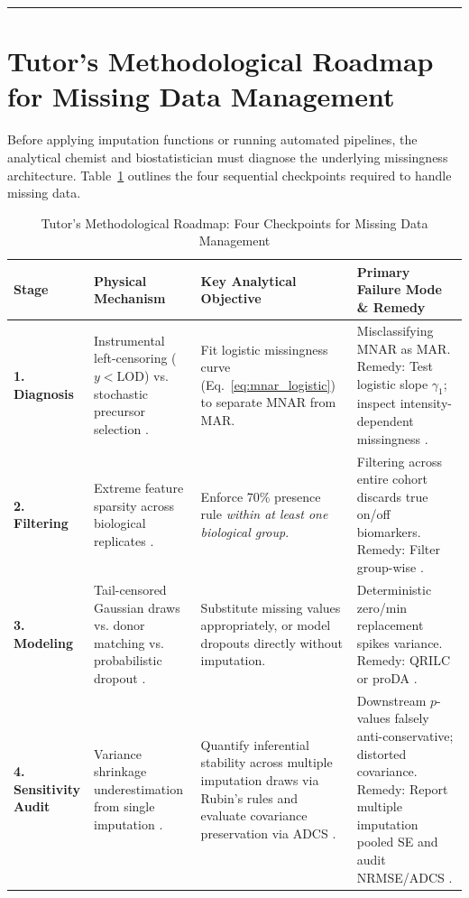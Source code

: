 \documentclass[11pt,oneside]{book}
\begin{document}
\vspace{0.8em}
\noindent\rule{\textwidth}{0.4pt}

\section{Tutor's Methodological Roadmap for Missing Data Management}

Before applying imputation functions or running automated pipelines, the analytical chemist and biostatistician must diagnose the underlying missingness architecture. Table~\ref{tab:missing_roadmap} outlines the four sequential checkpoints required to handle missing data.

\begin{table}[htbp]
\centering
\caption{Tutor's Methodological Roadmap: Four Checkpoints for Missing Data Management}
\label{tab:missing_roadmap}
\small
\begin{tabularx}{\textwidth}{l p{3.8cm} p{4.2cm} X}
\toprule
\textbf{Stage} & \textbf{Physical Mechanism} & \textbf{Key Analytical Objective} & \textbf{Primary Failure Mode \& Remedy} \\
\midrule
\textbf{1. Diagnosis} & Instrumental left-censoring ($y < \text{LOD}$) vs. stochastic precursor selection \cite{rubin1976inference, lazar2016accounting}. & Fit logistic missingness curve (Eq.~\ref{eq:mnar_logistic}) to separate MNAR from MAR. & Misclassifying MNAR as MAR. Remedy: Test logistic slope $\gamma_1$; inspect intensity-dependent missingness \cite{ahlmann2020proda}. \\
\addlinespace
\textbf{2. Filtering} & Extreme feature sparsity across biological replicates \cite{webb2020review, karpievitch2012normalization}. & Enforce 70\% presence rule \textit{within at least one biological group}. & Filtering across entire cohort discards true on/off biomarkers. Remedy: Filter group-wise \cite{zhang2018dep}. \\
\addlinespace
\textbf{3. Modeling} & Tail-censored Gaussian draws vs. donor matching vs. probabilistic dropout \cite{tyanova2016perseus, ahlmann2020proda, palstrom2020imputation}. & Substitute missing values appropriately, or model dropouts directly without imputation. & Deterministic zero/min replacement spikes variance. Remedy: QRILC or proDA \cite{ahlmann2020proda}. \\
\addlinespace
\textbf{4. Sensitivity Audit} & Variance shrinkage underestimation from single imputation \cite{rubin1987multiple, little2019statistical}. & Quantify inferential stability across multiple imputation draws via Rubin's rules and evaluate covariance preservation via ADCS \cite{templ2023visualization}. & Downstream $p$-values falsely anti-conservative; distorted covariance. Remedy: Report multiple imputation pooled SE \cite{barnard1999small, vanbuuren2018} and audit NRMSE/ADCS \cite{templ2023visualization}. \\
\bottomrule
\end{tabularx}
\end{table}
\end{document}
